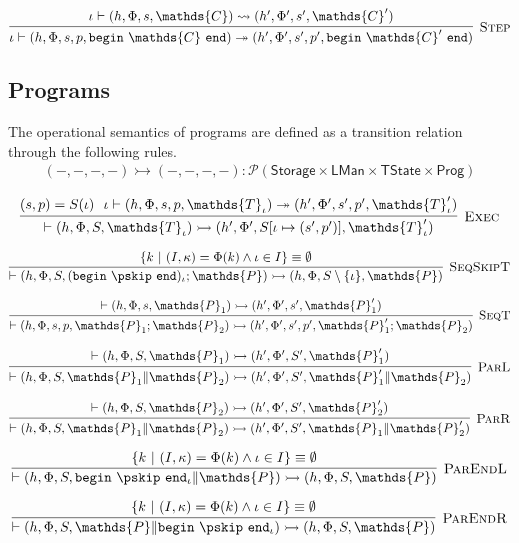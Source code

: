 \[
\infer[\textsc{Step}]
{
	\iota \vdash (h, \Phi, s, p, \mathtt{begin}\ \mathds{C}\ \mathtt{end})
	\twoheadrightarrow
	(h', \Phi', s', p', \mathtt{begin}\ \mathds{C}'\ \mathtt{end})
}
{
	\iota \vdash (h, \Phi, s, \mathds{C})
	\rightsquigarrow
	(h', \Phi', s', \mathds{C}')
}
\]

\subsection{Programs}

The operational semantics of programs are defined as a transition relation through the following rules.
\begin{gather*}
(-, -, -, -) \rightarrowtail (-, -, -, -) 
: \mathcal{P}(\mathsf{Storage} \times \mathsf{LMan} \times \mathsf{TState} \times \mathsf{Prog})
\end{gather*}

\[
\infer[\textsc{Exec}]
{
	\vdash (h, \Phi, S, \mathds{T}_\iota)
	\rightarrowtail
	(h', \Phi', S[\iota \mapsto (s', p')], \mathds{T}_\iota')
}
{
	(s, p) = S(\iota)\ \
	\iota \vdash (h, \Phi, s, p, \mathds{T}_\iota)
	\twoheadrightarrow
	(h', \Phi', s', p', \mathds{T}_\iota')
}
\]

\[
\infer[\textsc{SeqSkipT}]
{
	\vdash (h, \Phi, S, (\mathtt{begin}\ \pskip\ \mathtt{end})_\iota; \mathds{P})
	\rightarrowtail
	(h, \Phi, S \setminus \{\iota\}, \mathds{P})
}
{
	\{ k\ |\ (I, \kappa) = \Phi(k) \land \iota \in I \} \equiv \emptyset
}
\]

\[
\infer[\textsc{SeqT}]
{
	\vdash (h, \Phi, s, p, \mathds{P}_1; \mathds{P}_2)
	\rightarrowtail
	(h', \Phi', s', p', \mathds{P}_1'; \mathds{P}_2)
}
{
	\vdash (h, \Phi, s, \mathds{P}_1)
	\rightarrowtail
	(h', \Phi', s', \mathds{P}_1')
}
\]

\[
\infer[\textsc{ParL}]
{
	\vdash (h, \Phi, S, \mathds{P}_1 \| \mathds{P}_2)
	\rightarrowtail
	(h', \Phi', S', \mathds{P}_1' \| \mathds{P}_2)
}
{
	\vdash (h, \Phi, S, \mathds{P}_1)
	\rightarrowtail
	(h', \Phi', S', \mathds{P}_1')
}
\]

\[
\infer[\textsc{ParR}]
{
	\vdash (h, \Phi, S, \mathds{P}_1 \| \mathds{P}_2)
	\rightarrowtail
	(h', \Phi', S', \mathds{P}_1 \| \mathds{P}_2')
}
{
	\vdash (h, \Phi, S, \mathds{P}_2)
	\rightarrowtail
	(h', \Phi', S', \mathds{P}_2')
}
\]

\[
\infer[\textsc{ParEndL}]
{
	\vdash (h, \Phi, S, \mathtt{begin}\ \pskip\ \mathtt{end}_\iota \| \mathds{P})
	\rightarrowtail
	(h, \Phi, S, \mathds{P})
}
{
	\{ k\ |\ (I, \kappa) = \Phi(k) \land \iota \in I \} \equiv \emptyset
}
\]

\[
\infer[\textsc{ParEndR}]
{
	\vdash (h, \Phi, S, \mathds{P} \| \mathtt{begin}\ \pskip\ \mathtt{end}_\iota)
	\rightarrowtail
	(h, \Phi, S, \mathds{P})
}
{
	\{ k\ |\ (I, \kappa) = \Phi(k) \land \iota \in I \} \equiv \emptyset
}
\]